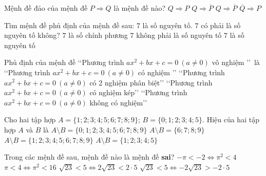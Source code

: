 \begin{ex}%
Mệnh đề đảo của mệnh đề $P\Rightarrow Q$ là mệnh đề nào?
\choice
{\True $Q\Rightarrow P$}
{$Q\Rightarrow\overline{P}$}
{$Q\Rightarrow\overline{P}$}
{$\overline{Q}\Rightarrow P$}
\end{ex}

\begin{ex}%
Tìm mệnh đề phủ định của mệnh đề sau:  $ 7 $ là số nguyên tố.
\choice
{$ 7 $  có phải là số nguyên tố không?}
{$ 7 $  là số chính phương}
{\True $ 7 $  không phải là số nguyên tố}
{$ 7 $  là số nguyên tố}
\end{ex}

\begin{ex}%
Phủ định của mệnh đề \lq\lq Phương trình $ ax^2+bx+c=0\ \left( a\ne 0 \right)$ vô nghiệm \rq\rq  \ là
\choice
{\True \lq\lq Phương trình $ ax^2+bx+c=0\ \left( a\ne 0 \right)$ có nghiệm \rq\rq }
{\lq\lq Phương trình $ ax^2+bx+c=0\ \left( a\ne 0 \right)$ có 2 nghiệm phân biệt\rq\rq }
{\lq\lq Phương trình $ ax^2+bx+c=0\ \left( a\ne 0 \right)$ có nghiệm kép\rq\rq }
{\lq\lq Phương trình $ ax^2 +bx+c=0\ \left( a\ne 0 \right)$ không có nghiệm\rq\rq }
\end{ex}


\begin{ex}%
Cho hai tập hợp $A=\{1 ; 2 ; 3 ; 4 ; 5 ; 6 ; 7 ; 8 ; 9\}$; $B=\{0 ; 1 ; 2 ; 3 ; 4 ; 5\}$. Hiệu của hai tập hợp $A$ và $B$ là
\choice
{$A \setminus B=\{0 ; 1 ; 2 ; 3 ; 4 ; 5 ; 6 ; 7 ; 8 ; 9\}$}
{\True $A \setminus B=\{6 ; 7 ; 8 ; 9\}$ }
{$A \setminus B=\{1 ; 2 ; 3 ; 4 ; 5 ; 6 ; 7 ; 8 ; 9\}$ }
{$A \setminus B=\{1 ; 2 ; 3 ; 4 ; 5\}$}
\end{ex}

\begin{ex} %
Trong các mệnh đề sau, mệnh đề nào là mệnh đề \textbf{sai}?
\choice
{\True $ - \pi  <  - 2 \Leftrightarrow {\pi ^2} < 4$ }
{ $\pi  < 4 \Leftrightarrow {\pi ^2} < 16$ }
{ $\sqrt {23}  < 5 \Leftrightarrow 2\sqrt {23}  < 2\cdot 5$ }
{ $\sqrt {23}  < 5 \Leftrightarrow  - 2\sqrt {23}  >  - 2\cdot 5$ }
\end{ex}

